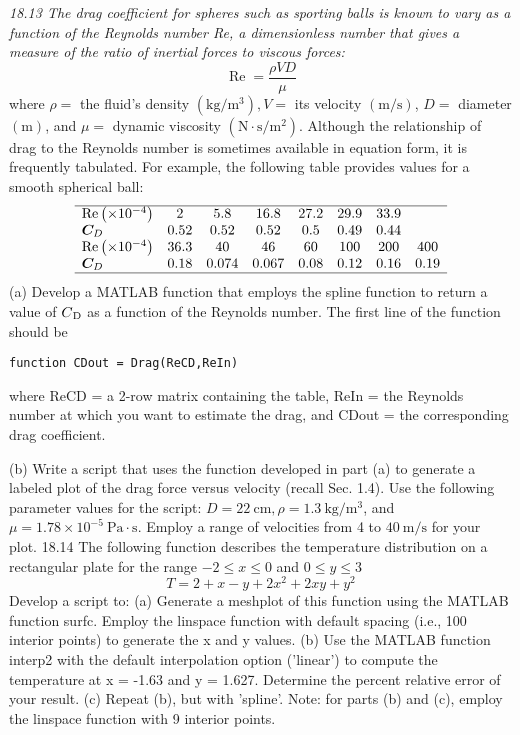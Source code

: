 \documentclass[../main.tex]{subfiles}
\begin{document}
\begin{multicols}{2}
\noindent\textit{18.13 The drag coefficient for spheres such as sporting balls
is known to vary as a function of the Reynolds number Re, a
dimensionless number that gives a measure of the ratio of
inertial forces to viscous forces:}
$$
\operatorname{Re}=\frac{\rho V D}{\mu}
$$
where $\rho=$ the fluid's density $\left(\mathrm{kg} / \mathrm{m}^{3}\right), V=$ its velocity $(\mathrm{m} / \mathrm{s})$, $D=$ diameter $(\mathrm{m})$, and $\mu=$ dynamic viscosity $\left(\mathrm{N} \cdot \mathrm{s} / \mathrm{m}^{2}\right)$.
Although the relationship of drag to the Reynolds number is
sometimes available in equation form, it is frequently tabulated. For example, the following table provides values for a
smooth spherical ball:
$$
\begin{array}{lccccccc}
    \hline \operatorname{Re}\left(\times 10^{-4}\right) & 2 & 5.8 & 16.8 & 27.2 & 29.9 & 33.9 & \\
    \boldsymbol{C}_{D} & 0.52 & 0.52 & 0.52 & 0.5 & 0.49 & 0.44 & \\
    \operatorname{Re}\left(\times 10^{-4}\right) & 36.3 & 40 & 46 & 60 & 100 & 200 & 400 \\
    \boldsymbol{C}_{D} & 0.18 & 0.074 & 0.067 & 0.08 & 0.12 & 0.16 & 0.19 \\
    \hline
    \end{array}
$$
    (a) Develop a MATLAB function that employs the spline
    function to return a value of $C\textsubscript{D}$ as a function of
    the Reynolds number. The first line of the function
    should be
    \begin{lstlisting}[numbers=none]
        function CDout = Drag(ReCD,ReIn)
    \end{lstlisting}
    where ReCD = a 2-row matrix containing the table, ReIn =
    the Reynolds number at which you want to estimate the
    drag, and CDout = the corresponding drag coefficient.

    (b) Write a script that uses the function developed in part
    (a) to generate a labeled plot of the drag force versus velocity (recall Sec. 1.4). Use the following parameter values for the script: $D=22 \mathrm{~cm}, \rho=1.3 \mathrm{~kg} / \mathrm{m}^{3}$, and $\mu=1.78 \times 10^{-5} \mathrm{~Pa} \cdot \mathrm{s}$. Employ a range of velocities from 4 to $40 \mathrm{~m} / \mathrm{s}$ for your plot.
    18.14 The following function describes the temperature distribution on a rectangular plate for the range $-2 \leq x \leq 0$ and $0 \leq y \leq 3$
    $$
    T=2+x-y+2 x^{2}+2 x y+y^{2}
    $$
    Develop a script to: (a) Generate a meshplot of this function
    using the MATLAB function surfc. Employ the linspace
    function with default spacing (i.e., 100 interior points) to
    generate the x and y values. (b) Use the MATLAB function
    interp2 with the default interpolation option ('linear')
    to compute the temperature at x = -1.63 and y = 1.627.
    Determine the percent relative error of your result. (c) Repeat (b), but with 'spline'. Note: for parts (b) and (c), employ the linspace function with 9 interior points.

\end{multicols}
\end{document}
